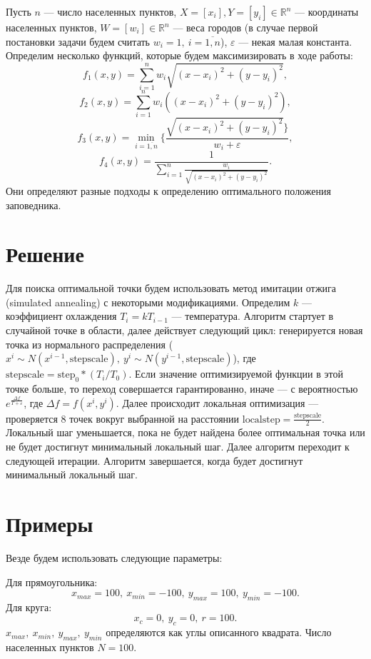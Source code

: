 \documentclass{article}
\begin{document}
Пусть \(n\) --- число населенных пунктов, \(X = [x_i], Y = [y_i] \in \mathbb{R}^n\) --- координаты населенных пунктов, \(W = [w_i] \in \mathbb{R}^n\) ---  веса городов (в случае первой постановки задачи будем считать \(w_i = 1,\ i = \overline{1, n}\)), \(\varepsilon\) ---  некая малая константа. 
Определим несколько функций, которые будем максимизировать в ходе работы:
\[f_1(x, y) = \sum_{i = 1}^n w_i\sqrt{(x - x_i)^2 + (y - y_i)^2},\]
\[f_2(x, y) = \sum_{i = 1}^n w_i((x - x_i)^2 + (y - y_i)^2),\]
\[f_3(x, y) = \min_{i = \overline{1, n}}\{\frac{\sqrt{(x - x_i)^2 + (y - y_i)^2}\}}{w_i + \varepsilon},\]
\[f_4(x, y) = \frac{1}{\sum_{i = 1}^n \frac{w_i}{\sqrt{(x - x_i)^2 + (y - y_i)^2}}}.\]
Они определяют разные подходы к определению оптимального положения заповедника.

\section{Решение}
Для поиска оптимальной точки будем использовать метод имитации отжига (simulated annealing) с некоторыми модификациями. Определим \(k\) --- коэффициент охлаждения \(T_i = kT_{i - 1}\) --- температура. Алгоритм стартует в случайной точке в области, далее действует следующий цикл: генерируется новая точка из нормального распределения (\(x^i \sim N(x^{i-1}, \text{stepscale}),\ y^i \sim N(y^{i-1}, \text{stepscale})\)), где \(\text{stepscale} = \text{step}_0 * (T_i / T_0)\). Если значение оптимизируемой функции в этой точке больше, то переход совершается гарантированно, иначе --- с вероятностью \(e^{\frac{\Delta f}{T + \varepsilon}}\), где \(\Delta f = f(x^i, y^i)\). Далее происходит локальная оптимизация --- проверяется 8 точек вокруг выбранной на расстоянии \(\text{localstep} = \frac{\text{stepscale}}{2}\). Локальный шаг уменьшается, пока не будет найдена более оптимальная точка или не будет достигнут минимальный локальный шаг. Далее алгоритм переходит к следующей итерации. Алгоритм завершается, когда будет достигнут минимальный локальный шаг.

\section{Примеры}
Везде будем использовать следующие параметры:

Для прямоугольника:
\[x_{max} = 100,\ x_{min} = -100,\ y_{max} = 100,\ y_{min} = -100.\]
Для круга:
\[x_c = 0,\ y_c = 0,\ r = 100.\]
\(x_{max},\ x_{min},\ y_{max},\ y_{min}\) определяются как углы описанного квадрата.
Число населенных пунктов \(N = 100\).
\end{document}
